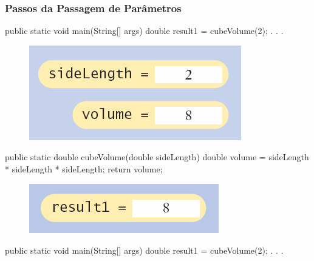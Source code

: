 \documentclass[xcolor={dvipsnames,table},aspectratio=169]{beamer}
\begin{document}
\begin{frame}
\begin{columns}[T]
\begin{column}{0.3\linewidth}
\begin{figure}[h]
\end{figure}
	\end{column}
\end{columns}
\end{frame}

\begin{frame}[fragile]\frametitle{Passos da Passagem de Parâmetros}
{\tiny
\begin{javacode}
public static void main(String[] args) {
  double result1 = cubeVolume(2);
  . . . 
}
\end{javacode}
\begin{figure}[h]
	\includegraphics[height=0.12\paperheight,center]{pucrs-ep-fprog-unidade_05-metodos-laminas-passo_passagem_de_parametros_1.png}
\end{figure}
\begin{javacode}
public static double cubeVolume(double sideLength) {
  double volume = sideLength * sideLength * sideLength;
  return volume;
}
\end{javacode}
\begin{figure}[h]
	\includegraphics[height=0.08\paperheight,center]{pucrs-ep-fprog-unidade_05-metodos-laminas-passo_passagem_de_parametros_2.png}
\end{figure}
\begin{javacode}
public static void main(String[] args) {
  double result1 = cubeVolume(2);
  . . . 
}
\end{javacode}
}
\end{frame}
\end{document}
